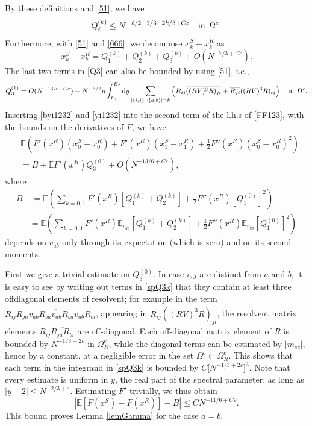 \documentclass[draft]{article}
\newcommand{\e}{\varepsilon}
\newcommand{\rd}{{\rm d}}
\newcommand{\non}{\nonumber}
\newcommand{\be}{\begin{equation}}
\newcommand{\ee}{\end{equation}}
\newcommand{\ov}{\overline}
\newcommand{\E}{{\mathbb E }}
\numberwithin{equation}{section}
\numberwithin{theorem}{section}
\numberwithin{definition}{section}
\numberwithin{remark}{section}
\begin{document}
By these definitions and \eqref{51},  we have
\be\label{byi1232}
Q_\ell^{(k)} \leq N^{-\ell/2-1/3 -2k/3+C\e} \,\,\, \,\,\,{\rm in } \,\,\,\Omega^c.  
\ee
Furthermore, with \eqref{51} and \eqref{666}, we decompose  $x^S_k-x^R_k$  as
\be\label{yi1232}
x^S_k-x^R_k =  Q_1^{(k)}+Q_2^{(k)}+ Q_3^{(k)}+O(N^{-7/3+C\e}).
\ee
The last two terms in \eqref{Q3}  can also be bounded by using \eqref{51}, i.e.,
\be\label{spQ3k}
Q_3^{(k)}  =O(N^{-13/6+C\e})-N^{-3/2}\eta  \int_{E_1}^{E_2} \rd y 
\sum_{|\{i,j\}\cap \{a,b\}|=k}\left(R_{ij}
\overline{((RV)^3 R)_{ji}}+\overline{R_{ji}}((RV)^3R)_{ij}\right)
\,\,\, \,\,\,{\rm in } \,\,\,\Omega^c.
\ee
 Inserting \eqref{byi1232} and \eqref{yi1232} into the second term of the 
l.h.s of \eqref{FF123}, with the bounds on the derivatives of $F$, we have 
\begin{align}\label{6755}
& \E\left( F'(x^R)(x^S_0-x^R_0)+ F'(x^R)(x^S_1-x^R_1) +
\frac12 F''(x^R)(x^S_0-x^R_0)^2\right)\\\nonumber
& = B +  \E F'(x^R)  Q_3^{(0)}   + O\left(N^{-13/6+C\e}\right),
\end{align}
where 
\begin{align}\label{Adef}
B  & := \E\left( \sum_{k=0, 1}  F'(x^R) [Q_1^{(k)}+Q_2^{(k)}] 
+\frac12 F''(x^R) [Q_1^{(0)}]^2  \right) \\
& =  \E\left( \sum_{k=0, 1}  F'(x^R) \E_{v_{ab}}  [Q_1^{(k)}+Q_2^{(k)}] 
+\frac12 F''(x^R) \E_{v_{ab}} [Q_1^{(0)}]^2  \right) \non
\end{align} 
depends on $v_{ab}$ only through its expectation (which is zero) and on its
second moments. 


First we give a trivial estimate on $Q_3^{(0)}$. In case $i,j$ are distinct
from $a$ and $b$, it is easy to see by writing out  terms
 in \eqref{spQ3k} that they contain 
at least three offdiagonal elements of resolvent; for example in the term
$R_{ij}\ov{ R_{ja} v_{ab} R_{ba} v_{ab} R_{ba} v_{ab} R_{bi}}$,
appearing in $R_{ij} \overline{((RV)^3 R)_{ji}}$, the resolvent matrix elements
$R_{ij}\ov{ R_{ja} R_{bi}}$ are off-diagonal.
Each off-diagonal matrix element of $R$ is bounded by $N^{-1/3+2\e}$
in $\Omega_R^c$, while
the diagonal terms can be estimated by $|m_{sc}|$, hence by a constant, 
at a negligible error in the set $\Omega^c\subset\Omega_R^c$.
This shows that each term in the integrand in \eqref{spQ3k}
is bounded by $C\big[ N^{-1/3+2\e}\big]^3$.
Note that  every estimate is uniform in $y$, the real
part of the spectral parameter, as long as $|y-2|\le N^{-2/3+\e}$.
Estimating $F'$ trivially, 
we thus  obtain
$$
\left|\E  [ F(x^S)- F(x^R) ] -B \right| \le CN^{-11/6+C\e}.
$$
This bound proves Lemma \ref{lemGamma} for the case $a=b$.
\end{document}
